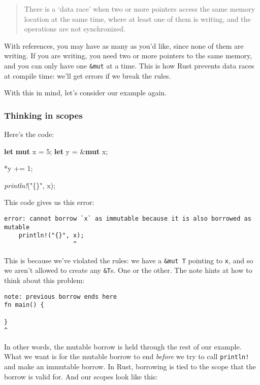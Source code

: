 \documentclass[a4paper,]{book}
\newenvironment{Shaded}{\begin{snugshade}}{\end{snugshade}}
\newcommand{\KeywordTok}[1]{\textcolor[rgb]{0.13,0.29,0.53}{\textbf{{#1}}}}
\newcommand{\DecValTok}[1]{\textcolor[rgb]{0.00,0.00,0.81}{{#1}}}
\newcommand{\StringTok}[1]{\textcolor[rgb]{0.31,0.60,0.02}{{#1}}}
\newcommand{\PreprocessorTok}[1]{\textcolor[rgb]{0.56,0.35,0.01}{\textit{{#1}}}}
\newcommand{\NormalTok}[1]{{#1}}
\begin{document}
\begin{quote}
There is a `data race' when two or more pointers access the same memory
location at the same time, where at least one of them is writing, and
the operations are not synchronized.
\end{quote}

With references, you may have as many as you'd like, since none of them
are writing. If you are writing, you need two or more pointers to the
same memory, and you can only have one \texttt{\&mut} at a time. This is
how Rust prevents data races at compile time: we'll get errors if we
break the rules.

With this in mind, let's consider our example again.

\subsubsection{Thinking in scopes}\label{thinking-in-scopes}

Here's the code:

\begin{Shaded}
\begin{Highlighting}[]
\KeywordTok{let} \KeywordTok{mut} \NormalTok{x = }\DecValTok{5}\NormalTok{;}
\KeywordTok{let} \NormalTok{y = &}\KeywordTok{mut} \NormalTok{x;}

\NormalTok{*y += }\DecValTok{1}\NormalTok{;}

\PreprocessorTok{println!}\NormalTok{(}\StringTok{"\{\}"}\NormalTok{, x);}
\end{Highlighting}
\end{Shaded}

This code gives us this error:

\begin{verbatim}
error: cannot borrow `x` as immutable because it is also borrowed as mutable
    println!("{}", x);
                   ^
\end{verbatim}

This is because we've violated the rules: we have a \texttt{\&mut\ T}
pointing to \texttt{x}, and so we aren't allowed to create any
\texttt{\&T}s. One or the other. The note hints at how to think about
this problem:

\begin{verbatim}
note: previous borrow ends here
fn main() {

}
^
\end{verbatim}

In other words, the mutable borrow is held through the rest of our
example. What we want is for the mutable borrow to end \emph{before} we
try to call \texttt{println!} and make an immutable borrow. In Rust,
borrowing is tied to the scope that the borrow is valid for. And our
scopes look like this:
\end{document}
